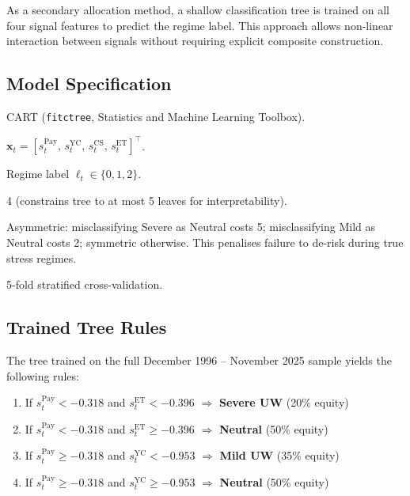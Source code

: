 \documentclass[11pt, a4paper]{article}
\begin{document}
As a secondary allocation method, a shallow classification tree
is trained on all four signal features to predict the regime label.
This approach allows non-linear interaction between signals without
requiring explicit composite construction.

\subsection{Model Specification}

\begin{description}[leftmargin=3em]
  \item[Algorithm] CART (\texttt{fitctree}, Statistics and Machine Learning
        Toolbox).
  \item[Features] $\mathbf{x}_t = [s_t^{\text{Pay}},\, s_t^{\text{YC}},\,
        s_t^{\text{CS}},\, s_t^{\text{ET}}]^\top$.
  \item[Target] Regime label $\ell_t \in \{0, 1, 2\}$.
  \item[Max splits] 4 (constrains tree to at most 5 leaves for interpretability).
  \item[Cost matrix] Asymmetric: misclassifying Severe as Neutral costs 5;
        misclassifying Mild as Neutral costs 2; symmetric otherwise. This
        penalises failure to de-risk during true stress regimes.
  \item[Validation] 5-fold stratified cross-validation.
\end{description}

\subsection{Trained Tree Rules}

The tree trained on the full December 1996 -- November 2025 sample yields
the following rules:

\begin{enumerate}[leftmargin=2em]
  \item If $s_t^{\text{Pay}} < -0.318$ and $s_t^{\text{ET}} < -0.396$
        $\Rightarrow$ \textbf{Severe UW} (20\% equity)
  \item If $s_t^{\text{Pay}} < -0.318$ and $s_t^{\text{ET}} \geq -0.396$
        $\Rightarrow$ \textbf{Neutral} (50\% equity)
  \item If $s_t^{\text{Pay}} \geq -0.318$ and $s_t^{\text{YC}} < -0.953$
        $\Rightarrow$ \textbf{Mild UW} (35\% equity)
  \item If $s_t^{\text{Pay}} \geq -0.318$ and $s_t^{\text{YC}} \geq -0.953$
        $\Rightarrow$ \textbf{Neutral} (50\% equity)
\end{enumerate}
\end{document}
